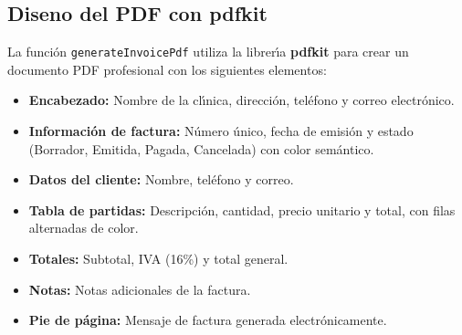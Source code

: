 \subsection{Diseno del PDF con pdfkit}

La funci\'on \texttt{generateInvoicePdf} utiliza la librer\'{\i}a
\textbf{pdfkit} para crear un documento PDF profesional con los siguientes
elementos:

\begin{itemize}[leftmargin=*]
    \item \textbf{Encabezado:} Nombre de la cl\'{\i}nica, direcci\'on,
          tel\'efono y correo electr\'onico.
    \item \textbf{Informaci\'on de factura:} N\'umero \'unico, fecha de
          emisi\'on y estado (Borrador, Emitida, Pagada, Cancelada) con
          color sem\'antico.
    \item \textbf{Datos del cliente:} Nombre, tel\'efono y correo.
    \item \textbf{Tabla de partidas:} Descripci\'on, cantidad, precio
          unitario y total, con filas alternadas de color.
    \item \textbf{Totales:} Subtotal, IVA (16\%) y total general.
    \item \textbf{Notas:} Notas adicionales de la factura.
    \item \textbf{Pie de p\'agina:} Mensaje de factura generada
          electr\'onicamente.
\end{itemize}

